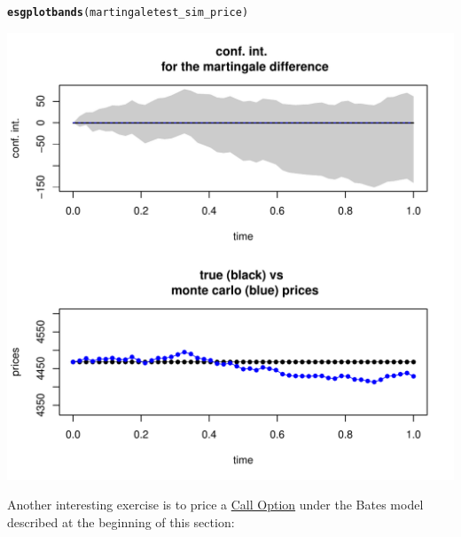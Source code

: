 \documentclass[a4paper]{article}\usepackage[]{graphicx}\usepackage[]{color}
\makeatletter
\def\maxwidth{ %
  \ifdim\Gin@nat@width>\linewidth
    \linewidth
  \else
    \Gin@nat@width
  \fi
}
\newcommand{\hlstd}[1]{\textcolor[rgb]{0.345,0.345,0.345}{#1}}%
\newcommand{\hlkwd}[1]{\textcolor[rgb]{0.737,0.353,0.396}{\textbf{#1}}}%
\newenvironment{kframe}{%
 \def\at@end@of@kframe{}%
 \ifinner\ifhmode%
  \def\at@end@of@kframe{\end{minipage}}%
  \begin{minipage}{\columnwidth}%
 \fi\fi%
 \def\FrameCommand##1{\hskip\@totalleftmargin \hskip-\fboxsep
 \colorbox{shadecolor}{##1}\hskip-\fboxsep
     \hskip-\linewidth \hskip-\@totalleftmargin \hskip\columnwidth}%
 \MakeFramed {\advance\hsize-\width
   \@totalleftmargin\z@ \linewidth\hsize
   \@setminipage}}%
 {\par\unskip\endMakeFramed%
 \at@end@of@kframe}
\newenvironment{knitrout}{}{} %
\makeatother
\begin{document}
\begin{knitrout}
\color{fgcolor}\begin{kframe}
\begin{alltt}
\hlkwd{esgplotbands}\hlstd{(martingaletest_sim_price)}
\end{alltt}
\end{kframe}
\includegraphics[width=\maxwidth]{figure/_example_SVJD_martingale_2-1} 

\end{knitrout}

\newpage

Another interesting exercise is to price a \href{https://en.wikipedia.org/wiki/Call_option}{Call Option} under the Bates model described at the beginning of this section:
\end{document}
